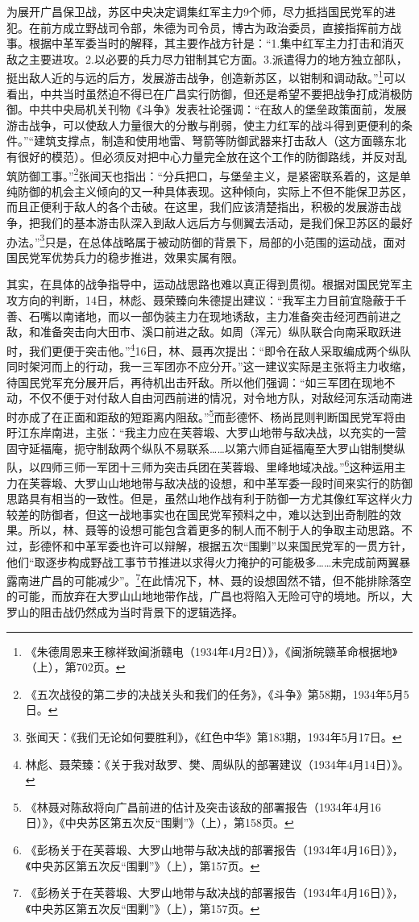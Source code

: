 为展开广昌保卫战，苏区中央决定调集红军主力9个师，尽力抵挡国民党军的进犯。在前方成立野战司令部，朱德为司令员，博古为政治委员，直接指挥前方战事。根据中革军委当时的解释，其主要作战方针是：“1.集中红军主力打击和消灭敌之主要进攻。2.以必要的兵力尽力钳制其它方面。3.派遣得力的地方独立部队，挺出敌人近的与远的后方，发展游击战争，创造新苏区，以钳制和调动敌。”\footnote{《朱德周恩来王稼祥致闽浙赣电（1934年4月2日）》，《闽浙皖赣革命根据地》（上），第702页。}可以看出，中共当时虽然迫不得已在广昌实行防御，但还是希望不要把战争打成消极防御。中共中央局机关刊物《斗争》发表社论强调：“在敌人的堡垒政策面前，发展游击战争，可以使敌人力量很大的分散与削弱，使主力红军的战斗得到更便利的条件。”“建筑支撑点，制造和使用地雷、弩箭等防御武器来打击敌人（这方面赣东北有很好的模范）。但必须反对把中心力量完全放在这个工作的防御路线，并反对乱筑防御工事。”\footnote{《五次战役的第二步的决战关头和我们的任务》，《斗争》第58期，1934年5月5日。}张闻天也指出：“分兵把口，与堡垒主义，是紧密联系着的，这是单纯防御的机会主义倾向的又一种具体表现。这种倾向，实际上不但不能保卫苏区，而且正便利于敌人的各个击破。在这里，我们应该清楚指出，积极的发展游击战争，把我们的基本游击队深入到敌人远后方与侧翼去活动，是我们保卫苏区的最好办法。”\footnote{张闻天：《我们无论如何要胜利》，《红色中华》第183期，1934年5月17日。}只是，在总体战略属于被动防御的背景下，局部的小范围的运动战，面对国民党军优势兵力的稳步推进，效果实属有限。


其实，在具体的战争指导中，运动战思路也难以真正得到贯彻。根据对国民党军主攻方向的判断，14日，林彪、聂荣臻向朱德提出建议：“我军主力目前宜隐蔽于千善、石嘴以南诸地，而以一部伪装主力在现地诱敌，主力准备突击经河西前进之敌，和准备突击向大田市、溪口前进之敌。如周（浑元）纵队联合向南采取跃进时，我们更便于突击他。”\footnote{林彪、聂荣臻：《关于我对敌罗、樊、周纵队的部署建议（1934年4月14日）》。}16日，林、聂再次提出：“即令在敌人采取编成两个纵队同时架河而上的行动，我一三军团亦不应分开。”这一建议实际是主张将主力收缩，待国民党军充分展开后，再待机出击歼敌。所以他们强调：“如三军团在现地不动，不仅不便于对付敌人自由河西前进的情况，对令地方队，对敌经河东活动南进时亦成了在正面和距敌的短距离内阻敌。”\footnote{《林聂对陈敌将向广昌前进的估计及突击该敌的部署报告（1934年4月16日）》，《中央苏区第五次反“围剿”》（上），第158页。}而彭德怀、杨尚昆则判断国民党军将由盱江东岸南进，主张：“我主力应在芙蓉塅、大罗山地带与敌决战，以充实的一营固守延福庵，扼守制敌两个纵队不易联系……以第六师自延福庵至大罗山钳制樊纵队，以四师三师一军团十三师为突击兵团在芙蓉塅、里峰地域决战。”\footnote{《彭杨关于在芙蓉塅、大罗山地带与敌决战的部署报告（1934年4月16日）》，《中央苏区第五次反“围剿”》（上），第157页。}这种运用主力在芙蓉塅、大罗山山地地带与敌决战的设想，和中革军委一段时间来实行的防御思路具有相当的一致性。但是，虽然山地作战有利于防御一方尤其像红军这样火力较差的防御者，但这一战地事实也在国民党军预料之中，难以达到出奇制胜的效果。所以，林、聂等的设想可能包含着更多的制人而不制于人的争取主动思路。不过，彭德怀和中革军委也许可以辩解，根据五次“围剿”以来国民党军的一贯方针，他们“取逐步构成野战工事节节推进以求得火力掩护的可能极多……未完成前两翼暴露南进广昌的可能减少”。\footnote{《彭杨关于在芙蓉塅、大罗山地带与敌决战的部署报告（1934年4月16日）》，《中央苏区第五次反“围剿”》（上），第157页。}在此情况下，林、聂的设想固然不错，但不能排除落空的可能，而放弃在大罗山山地地带作战，广昌也将陷入无险可守的境地。所以，大罗山的阻击战仍然成为当时背景下的逻辑选择。


